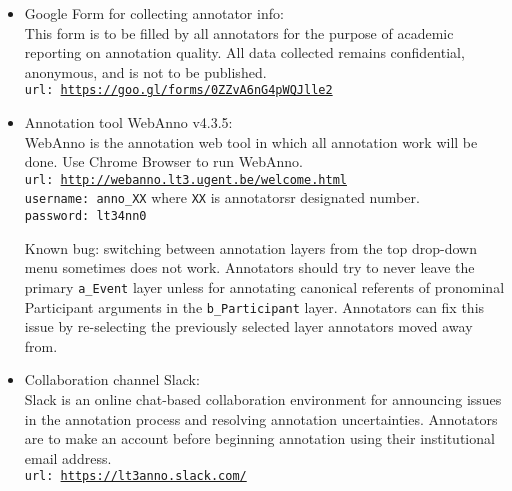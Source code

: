 \begin{itemize}[leftmargin=*]
    \item Google Form for collecting annotator info:\\
        This form is to be filled by all annotators for the purpose of academic reporting on annotation quality. All data collected remains confidential, anonymous, and is not to be published.\\
        \texttt{url: \url{https://goo.gl/forms/0ZZvA6nG4pWQJlle2}}
    
    \item Annotation tool WebAnno v4.3.5:\\
        WebAnno is the annotation web tool in which all annotation work will be done.
        Use Chrome Browser to run WebAnno.\\
        \texttt{url: \url{http://webanno.lt3.ugent.be/welcome.html}}\\
        \texttt{username: anno\_XX} where \texttt{XX} is annotatorsr designated number.\\
        \texttt{password: lt34nn0}
        
        Known bug: switching between annotation layers from the top drop-down menu sometimes does not work. Annotators should try to never leave the primary \texttt{a\_Event} layer unless for annotating canonical referents of pronominal Participant arguments in the \texttt{b\_Participant} layer. Annotators can fix this issue by re-selecting the previously selected layer annotators moved away from.
        
    \item Collaboration channel Slack:\\
        Slack is an online chat-based collaboration environment for announcing issues in the annotation process and resolving annotation uncertainties. Annotators are to make an account before beginning annotation using their institutional email address.\\
        \texttt{url: \url{https://lt3anno.slack.com/}}\\
        

\end{itemize}

